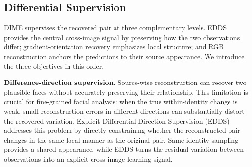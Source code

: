 \documentclass[10pt,journal,compsoc]{IEEEtran}
\begin{document}
\subsection{Differential Supervision}
\label{sec:dime_losses}

DIME supervises the recovered pair at three complementary levels. EDDS provides the central cross-image signal by preserving how the two observations differ; gradient-orientation recovery emphasizes local structure; and RGB reconstruction anchors the predictions to their source appearance. We introduce the three objectives in this order.

\noindent\textbf{Difference-direction supervision.} Source-wise reconstruction can recover two plausible faces without accurately preserving their relationship. This limitation is crucial for fine-grained facial analysis: when the true within-identity change is weak, small reconstruction errors in different directions can substantially distort the recovered variation. Explicit Differential Direction Supervision (EDDS) addresses this problem by directly constraining whether the reconstructed pair changes in the same local manner as the original pair. Same-identity sampling provides a shared appearance, while EDDS turns the residual variation between observations into an explicit cross-image learning signal.
\end{document}
